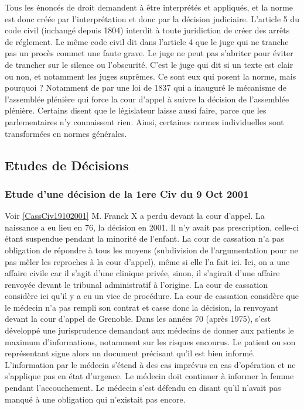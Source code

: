 \documentclass[math]{cours}
\begin{document}
Tous les énoncés de droit demandent à être interprétés et appliqués, et la norme est donc créée par l'interprétation et donc par la décision judiciaire.
L'article 5 du code civil (inchangé depuis 1804) interdit à toute juridiction de créer des arrêts de réglement.
Le même code civil dit dans l'article 4 que le juge qui ne tranche pas un procès commet une faute grave.
Le juge ne peut pas s'abriter pour éviter de trancher sur le silence ou l'obscurité.
C'est le juge qui dit si un texte est clair ou non, et notamment les juges suprêmes. Ce sont eux qui posent la norme, mais pourquoi ?
Notamment de par une loi de 1837 qui a inauguré le mécanisme de l'assemblée plénière qui force la cour d'appel à suivre la décision de l'assemblée plénière.
Certains disent que le législateur laisse aussi faire, parce que les parlementaires n'y connaissent rien.
Ainsi, certaines normes individuelles sont transformées en normes générales.

\subsection{Etudes de Décisions}
\subsubsection{Etude d'une décision de la 1ere Civ du 9 Oct 2001}
Voir \ref{CassCiv19102001}
M. Franck X a perdu devant la cour d'appel.
La naissance a eu lieu en 76, la décision en 2001. Il n'y avait pas prescription, celle-ci étant suspendue pendant la minorité de l'enfant.
La cour de cassation n'a pas obligation de répondre à tous les moyens (subdivision de l'argumentation pour ne pas mêler les reproches à la cour d'appel), même si elle l'a fait ici.
Ici, on a une affaire civile car il s'agit d'une clinique privée, sinon, il s'agirait d'une affaire renvoyée devant le tribunal administratif à l'origine.
La cour de cassation considère ici qu'il y a eu un vice de procédure.
La cour de cassation considère que le médecin n'a pas rempli son contrat et casse donc la décision, la renvoyant devant la cour d'appel de Grenoble.
Dans les années 70 (après 1975), s'est développé une jurisprudence demandant aux médecins de donner aux patients le maximum d'informations, notamment sur les risques encourus.
Le patient ou son représentant signe alors un document précisant qu'il est bien informé.
L'information par le médecin s'étend à des cas imprévus en cas d'opération et ne s'applique pas en état d'urgence.
Le médecin doit continuer à informer la femme pendant l'accouchement.
Le médecin s'est défendu en disant qu'il n'avait pas manqué à une obligation qui n'existait pas encore.\\
\end{document}
